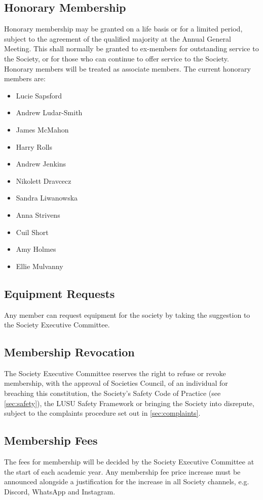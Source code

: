 \documentclass[11pt,a4paper]{article}
\begin{document}
\subsection{Honorary Membership}
Honorary membership may be granted on a life basis or for a limited period, subject to the agreement of the qualified majority at the Annual General Meeting. This shall normally be granted to ex-members for outstanding service to the Society, or for those who can continue to offer service to the Society. Honorary members will be treated as associate members. The current honorary members are:
\begin{itemize}
  \item Lucie Sapsford
  \item Andrew Ludar-Smith
  \item James McMahon
  \item Harry Rolls
  \item Andrew Jenkins
  \item Nikolett Dravcecz
  \item Sandra Liwanowska
  \item Anna Strivens
  \item Cuil Short
  \item Amy Holmes
  \item Ellie Mulvanny
\end{itemize}

\subsection{Equipment Requests}
Any member can request equipment for the society by taking the suggestion to the Society Executive Committee.

\subsection{Membership Revocation}
The Society Executive Committee reserves the right to refuse or revoke membership, with the approval of Societies Council, of an individual for breaching this constitution, the Society's Safety Code of Practice (see \autoref{sec:safety}), the LUSU Safety Framework or bringing the Society into disrepute, subject to the complaints procedure set out in \autoref{sec:complaints}.

\subsection{Membership Fees}
The fees for membership will be decided by the Society Executive Committee at the start of each academic year. Any membership fee price increase must be announced alongside a justification for the increase in all Society channels, e.g. Discord, WhatsApp and Instagram.
\end{document}
